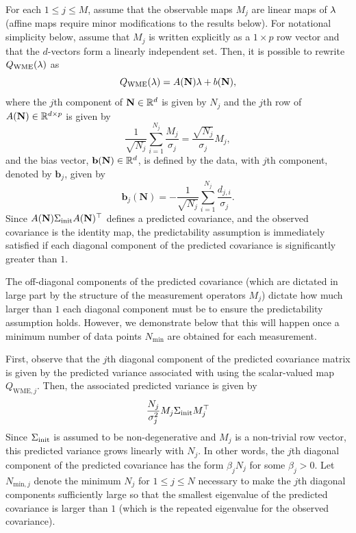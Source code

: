For each $1\leq j\leq M$, assume that the observable maps $M_j$ are linear maps of $\lambda$ (affine maps require minor modifications to the results below).
For notational simplicity below, assume that $M_j$ is written explicitly as a $1\times p$ row vector and that the $d$-vectors form a linearly independent set.
Then, it is possible to rewrite $Q_{\text{WME}}(\lambda)$ as
\begin{equation}
	Q_\text{WME}(\lambda) = A(\mathbf{N})\lambda + b(\mathbf{N}),
\end{equation}
where the $j$th component of $\mathbf{N}\in\mathbb{R}^d$ is given by $N_j$ and the $j$th row of $A(\mathbf{N})\in\mathbb{R}^{d\times p}$ is given by
\begin{equation}
	\frac{1}{\sqrt{N_j}} \sum_{i=1}^{N_j} \frac{M_j}{\sigma_j} = \frac{\sqrt{N_j}}{\sigma_j}M_j,
\end{equation}
and the bias vector, $\mathbf{b}(\mathbf{N})\in\mathbb{R}^d$, is defined by the data, with $j$th component, denoted by $\mathbf{b}_j$, given by
\begin{equation}
	\mathbf{b}_j(\mathbf{N}) = -\frac{1}{\sqrt{N_j}} \sum_{i=1}^{N_j} \frac{d_{j,i}}{\sigma_j}.
\end{equation}
Since $A(\mathbf{N})\Sigma_\text{init} A(\mathbf{N})^\top$ defines a predicted covariance, and the observed covariance is the identity map, the predictability assumption is immediately satisfied if each diagonal component of the predicted covariance is significantly greater than $1$.

The off-diagonal components of the predicted covariance (which are dictated in large part by the structure of the measurement operators $M_j$) dictate how much larger than $1$ each diagonal component must be to ensure the predictability assumption holds.
However, we demonstrate below that this will happen once a minimum number of data points $N_\text{min}$ are obtained for each measurement.

First, observe that the $j$th diagonal component of the predicted covariance matrix is  given by the predicted variance associated with using the scalar-valued map $Q_{\text{WME},j}$.
Then, the associated predicted variance is given by
\begin{equation}
	\frac{N_j}{\sigma_j^2} M_j\Sigma_\text{init} M_j^\top
\end{equation}
Since $\Sigma_\text{init}$ is assumed to be non-degenerative and $M_j$ is a non-trivial row vector, this predicted variance grows linearly with $N_j$.
In other words, the $j$th diagonal component of the predicted covariance has the form $\beta_j N_j$ for some $\beta_j>0$.
Let $N_{\text{min},j}$ denote the minimum $N_j$ for $1\leq j\leq N$ necessary to make the $j$th diagonal components sufficiently large so that the smallest eigenvalue of the predicted covariance is larger than $1$ (which is the repeated eigenvalue for the observed covariance).

